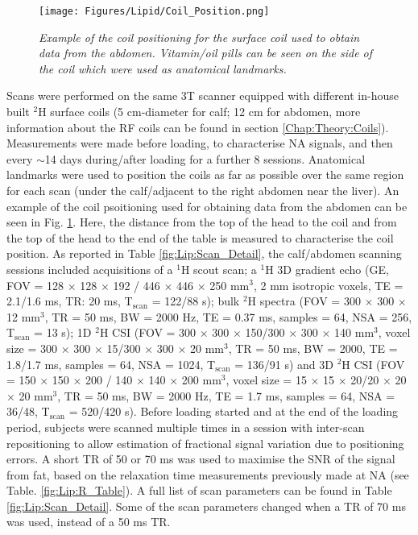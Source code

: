\begin{figure}
    \centering
    \texttt{[image: Figures/Lipid/Coil\_Position.png]}
    \caption{\textit{Example of the coil positioning for the surface coil used to obtain data from the abdomen. Vitamin/oil pills can be seen on the side of the coil which were used as anatomical landmarks.}}
    \label{fig:Lip:Coil_Photo}
\end{figure}

Scans were performed on the same 3T scanner equipped with different in-house built $^2$H surface coils (5 cm-diameter for calf; 12 cm for abdomen, more information about the \ac{RF} coils can be found in section \ref{Chap:Theory:Coils}). Measurements were made before loading, to characterise \ac{NA} signals, and then every $\sim$14 days during/after loading for a further 8 sessions. Anatomical landmarks were used to position the coils as far as possible over the same region for each scan (under the calf/adjacent to the right abdomen near the liver). An example of the coil psoitioning used for obtaining data from the abdomen can be seen in Fig. \ref{fig:Lip:Coil_Photo}. Here, the distance from the top of the head to the coil and from the top of the head to the end of the table is measured to characterise the coil position. As reported in Table \ref{fig:Lip:Scan_Detail}, the calf/abdomen scanning sessions included acquisitions of a $^1$H scout scan; a $^1$H 3D gradient echo (\ac{GE}, \ac{FOV} = 128 $\times$ 128 $\times$ 192 / 446 $\times$ 446 $\times$ 250 mm$^3$, 2 mm isotropic voxels, \ac{TE} =  2.1/1.6 ms, TR: 20 ms, T$_\text{scan}$ = 122/88 s); bulk $^2$H spectra (\ac{FOV} = 300 $\times$ 300 $\times$ 12 mm$^3$, \ac{TR} = 50 ms, \ac{BW} = 2000 Hz, \ac{TE} = 0.37 ms, samples = 64, NSA = 256, T$_\text{scan}$ = 13 s); 1D $^2$H \ac{CSI} (\ac{FOV} = 300 $\times$ 300 $\times$ 150/300 $\times$ 300 $\times$ 140 mm$^3$, voxel size = 300 $\times$ 300 $\times$ 15/300 $\times$ 300 $\times$ 20 mm$^3$, \ac{TR} = 50 ms, \ac{BW} = 2000, \ac{TE} = 1.8/1.7 ms, samples = 64, NSA = 1024, T$_\text{scan}$ = 136/91 s) and 3D $^2$H \ac{CSI} (\ac{FOV} = 150 $\times$ 150 $\times$ 200 / 140 $\times$ 140 $\times$ 200 mm$^3$, voxel size = 15 $\times$ 15 $\times$ 20/20 $\times$ 20 $\times$ 20 mm$^3$, TR = 50 ms, \ac{BW} = 2000 Hz, \ac{TE} = 1.7 ms, samples = 64, NSA = 36/48, T$_\text{scan}$ = 520/420 s). Before loading started and at the end of the loading period, subjects were scanned multiple times in a session with inter-scan repositioning to allow estimation of fractional signal variation due to positioning errors. A short \ac{TR} of 50 or 70 ms was used to maximise the \ac{SNR} of the signal from fat, based on the relaxation time measurements previously made at \ac{NA} (see Table. \ref{fig:Lip:R_Table}). A full list of scan parameters can be found in Table \ref{fig:Lip:Scan_Detail}. Some of the scan parameters changed when a \ac{TR} of 70 ms was used, instead of a 50 ms \ac{TR}. 

